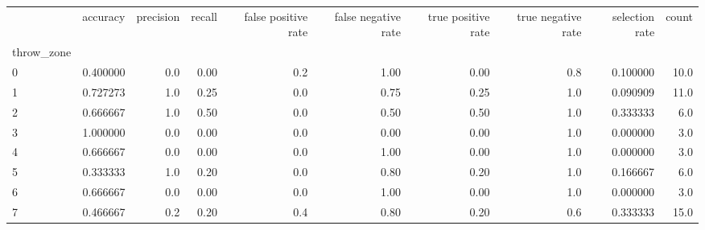 \begin{tabular}{lrrrrrrrrr}
\toprule
{} &  accuracy &  precision &  recall &  false positive rate &  false negative rate &  true positive rate &  true negative rate &  selection rate &  count \\
throw\_zone &           &            &         &                      &                      &                     &                     &                 &        \\
\midrule
0          &  0.400000 &        0.0 &    0.00 &                  0.2 &                 1.00 &                0.00 &                 0.8 &        0.100000 &   10.0 \\
1          &  0.727273 &        1.0 &    0.25 &                  0.0 &                 0.75 &                0.25 &                 1.0 &        0.090909 &   11.0 \\
2          &  0.666667 &        1.0 &    0.50 &                  0.0 &                 0.50 &                0.50 &                 1.0 &        0.333333 &    6.0 \\
3          &  1.000000 &        0.0 &    0.00 &                  0.0 &                 0.00 &                0.00 &                 1.0 &        0.000000 &    3.0 \\
4          &  0.666667 &        0.0 &    0.00 &                  0.0 &                 1.00 &                0.00 &                 1.0 &        0.000000 &    3.0 \\
5          &  0.333333 &        1.0 &    0.20 &                  0.0 &                 0.80 &                0.20 &                 1.0 &        0.166667 &    6.0 \\
6          &  0.666667 &        0.0 &    0.00 &                  0.0 &                 1.00 &                0.00 &                 1.0 &        0.000000 &    3.0 \\
7          &  0.466667 &        0.2 &    0.20 &                  0.4 &                 0.80 &                0.20 &                 0.6 &        0.333333 &   15.0 \\
\bottomrule
\end{tabular}
